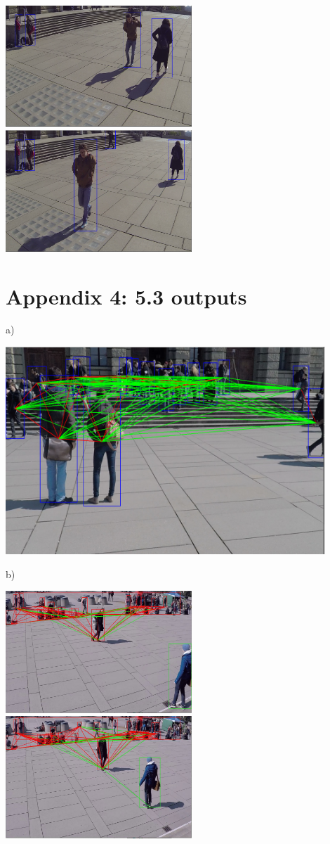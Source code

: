 \documentclass[12pt]{report}
\begin{document}
\includegraphics[width=70mm]{./images/appendix/Video3output3.PNG}
\includegraphics[width=70mm]{./images/appendix/Video3output4.PNG}

\section*{Appendix 4: 5.3 outputs}
a)


\includegraphics[width=120mm]{./images/appendix/SDNoFilterByPixel.PNG}

b)


\includegraphics[width=70mm]{./images/appendix/Cam7Clip1BoundingBoxTest1.JPG}
\includegraphics[width=70mm]{./images/appendix/Cam7Clip1BoundingBoxTest2.JPG}
\end{document}
